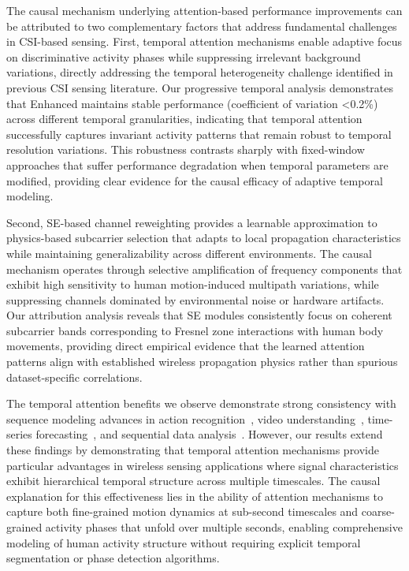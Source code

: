 \documentclass[journal]{IEEEtran}
\begin{document}
The causal mechanism underlying attention-based performance improvements can be attributed to two complementary factors that address fundamental challenges in CSI-based sensing. First, temporal attention mechanisms enable adaptive focus on discriminative activity phases while suppressing irrelevant background variations, directly addressing the temporal heterogeneity challenge identified in previous CSI sensing literature. Our progressive temporal analysis demonstrates that Enhanced maintains stable performance (coefficient of variation <0.2\%) across different temporal granularities, indicating that temporal attention successfully captures invariant activity patterns that remain robust to temporal resolution variations. This robustness contrasts sharply with fixed-window approaches that suffer performance degradation when temporal parameters are modified, providing clear evidence for the causal efficacy of adaptive temporal modeling.

Second, SE-based channel reweighting provides a learnable approximation to physics-based subcarrier selection that adapts to local propagation characteristics while maintaining generalizability across different environments. The causal mechanism operates through selective amplification of frequency components that exhibit high sensitivity to human motion-induced multipath variations, while suppressing channels dominated by environmental noise or hardware artifacts. Our attribution analysis reveals that SE modules consistently focus on coherent subcarrier bands corresponding to Fresnel zone interactions with human body movements, providing direct empirical evidence that the learned attention patterns align with established wireless propagation physics rather than spurious dataset-specific correlations.

The temporal attention benefits we observe demonstrate strong consistency with sequence modeling advances in action recognition~\cite{li2020tea}, video understanding~\cite{bertasius2021timesformer}, time-series forecasting~\cite{lim2021tft}, and sequential data analysis~\cite{zhou2021informer}. However, our results extend these findings by demonstrating that temporal attention mechanisms provide particular advantages in wireless sensing applications where signal characteristics exhibit hierarchical temporal structure across multiple timescales. The causal explanation for this effectiveness lies in the ability of attention mechanisms to capture both fine-grained motion dynamics at sub-second timescales and coarse-grained activity phases that unfold over multiple seconds, enabling comprehensive modeling of human activity structure without requiring explicit temporal segmentation or phase detection algorithms.
\end{document}
